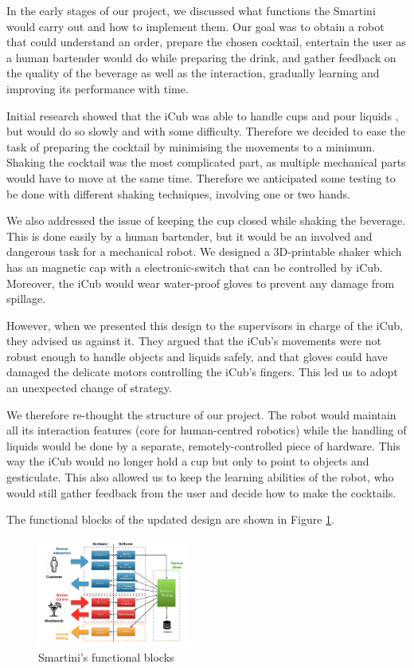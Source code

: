 \documentclass[conference]{IEEEtran}
\begin{document}
In the early stages of our project, we discussed what functions the Smartini would carry out and how to implement them. Our goal was to obtain a robot that could understand an order, prepare the chosen cocktail, entertain the user as a human bartender would do while preparing the drink, and gather feedback on the quality of the beverage as well as the interaction, gradually learning and improving its performance with time. 

Initial research showed that the iCub  was able to handle cups and pour liquids \cite{pouringLiquids}, but would do so slowly and with some difficulty. Therefore we decided to ease the task of preparing the cocktail by minimising the movements to a minimum. Shaking the cocktail was the most complicated part, as multiple mechanical parts would have to move at the same time. Therefore we anticipated some testing to be done with different shaking techniques, involving one or two hands. 

We also addressed the issue of keeping the cup closed while shaking the beverage. This is done easily by a human bartender, but it would be an involved and dangerous task for a mechanical robot. We designed a 3D-printable shaker which has an magnetic cap with a electronic-switch that can be controlled by iCub. Moreover, the iCub would wear water-proof gloves to prevent any damage from spillage. 

However, when we presented this design to the supervisors in charge of the iCub, they advised us against it. They argued that the iCub's movements were not robust enough to handle objects and liquids safely, and that gloves could have damaged the delicate motors controlling the iCub's fingers. This led us to adopt an unexpected change of strategy. 

We therefore re-thought the structure of our project. The robot would maintain all its interaction features (core for human-centred robotics) while the handling of liquids would be done by a separate, remotely-controlled piece of hardware. This way the iCub would no longer hold a cup but only to point to objects and gesticulate. This also allowed us to keep the learning abilities of the robot, who would still gather feedback from the user and decide how to make the cocktails.

The functional blocks of the updated design are shown in Figure \ref{fig:blockDiagram}.

\begin{figure}[h]
	\centering
	\includegraphics[width=0.45\textwidth]{figures/BlockDiagram}
	\caption{Smartini's functional blocks}
	\label{fig:blockDiagram}
\end{figure}
\end{document}
